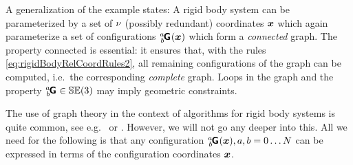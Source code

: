 A generalization of the example states:
A rigid body system can be parameterized by a set of $\nu$ (possibly redundant) coordinates $\boldsymbol{x}$ which again parameterize a set of configurations $\bodyHomoCoord{\BidxI}{\BidxII}(\sysCoord)$ which form a \textit{connected} graph.
The property connected is essential: it ensures that, with the rules \eqref{eq:rigidBodyRelCoordRules2}, all remaining configurations of the graph can be computed, i.e.\ the corresponding \textit{complete} graph.
Loops in the graph and the property $\bodyHomoCoord{\BidxI}{\BidxII} \in \SpecialEuclideanGroup(3)$ may imply geometric constraints.

The use of graph theory in the context of algorithms for rigid body systems is quite common, see e.g.\ \cite[sec.\,8.2]{Schwertassek:MultibodySystems} or \cite[sec.\,5.3]{Wittenburg:DynamicsOfMultibodySystems}.
However, we will not go any deeper into this.
All we need for the following is that any configuration $\bodyHomoCoord{\BidxI}{\BidxII}(\sysCoord), \BidxI,\BidxII = 0\ldots\numRigidBodies$ can be expressed in terms of the configuration coordinates $\boldsymbol{x}$.

